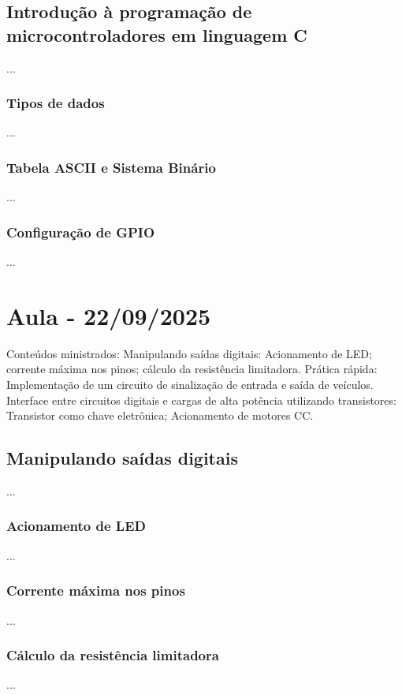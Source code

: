 \documentclass{article}
\begin{document}
\subsection{Introdução à programação de microcontroladores em linguagem C}
...

\subsubsection{Tipos de dados} 
...

\subsubsection{Tabela ASCII e Sistema Binário}
...

\subsubsection{Configuração de GPIO}
...

\section{Aula - 22/09/2025}
Conteúdos ministrados:  Manipulando saídas digitais: Acionamento de LED; corrente máxima nos pinos; cálculo da resistência limitadora. Prática rápida: Implementação de um circuito de sinalização de entrada e saída de veículos. Interface entre circuitos digitais e cargas de alta potência utilizando transistores: Transistor como chave eletrônica; Acionamento de motores CC. 

\subsection{Manipulando saídas digitais}
...

\subsubsection{Acionamento de LED}
...

\subsubsection{Corrente máxima nos pinos}
...

\subsubsection{Cálculo da resistência limitadora}
...
\end{document}
